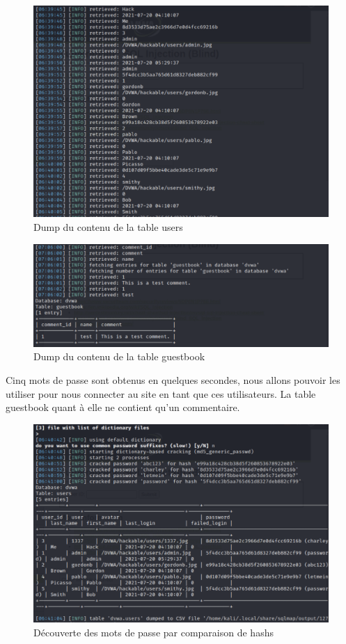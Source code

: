 \documentclass[12pt, oneside]{article}
\begin{document}
\begin{figure}[H]
\centering
\includegraphics[scale=0.4]{7}
\caption{Dump du contenu de la table users}
\end{figure}

\begin{figure}[H]
\centering
\includegraphics[scale=0.4]{9}
\caption{Dump du contenu de la table guestbook}
\end{figure}

Cinq mots de passe sont obtenus en quelques secondes, nous allons pouvoir les utiliser pour nous connecter au site en tant que ces utilisateurs. La table guestbook quant à elle ne contient qu'un commentaire.

\begin{figure}[H]
\centering
\includegraphics[scale=0.4]{8}
\caption{Découverte des mots de passe par comparaison de hashs}
\end{figure}
\end{document}
